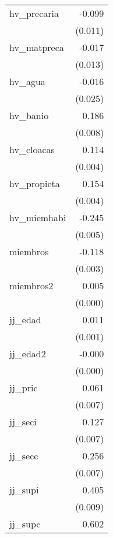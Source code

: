 {\begin{longtable}{l*{1}{D{.}{.}{-1}}}
\addlinespace
hv\_precaria &      -0.099\sym{***}\\
            &     (0.011)         \\
\addlinespace
hv\_matpreca &      -0.017         \\
            &     (0.013)         \\
\addlinespace
hv\_agua     &      -0.016         \\
            &     (0.025)         \\
\addlinespace
hv\_banio    &       0.186\sym{***}\\
            &     (0.008)         \\
\addlinespace
hv\_cloacas  &       0.114\sym{***}\\
            &     (0.004)         \\
\addlinespace
hv\_propieta &       0.154\sym{***}\\
            &     (0.004)         \\
\addlinespace
hv\_miemhabi &      -0.245\sym{***}\\
            &     (0.005)         \\
\addlinespace
miembros    &      -0.118\sym{***}\\
            &     (0.003)         \\
\addlinespace
miembros2   &       0.005\sym{***}\\
            &     (0.000)         \\
\addlinespace
jj\_edad     &       0.011\sym{***}\\
            &     (0.001)         \\
\addlinespace
jj\_edad2    &      -0.000\sym{***}\\
            &     (0.000)         \\
\addlinespace
jj\_pric     &       0.061\sym{***}\\
            &     (0.007)         \\
\addlinespace
jj\_seci     &       0.127\sym{***}\\
            &     (0.007)         \\
\addlinespace
jj\_secc     &       0.256\sym{***}\\
            &     (0.007)         \\
\addlinespace
jj\_supi     &       0.405\sym{***}\\
            &     (0.009)         \\
\addlinespace
jj\_supc     &       0.602\sym{***}\\

\end{longtable}}
